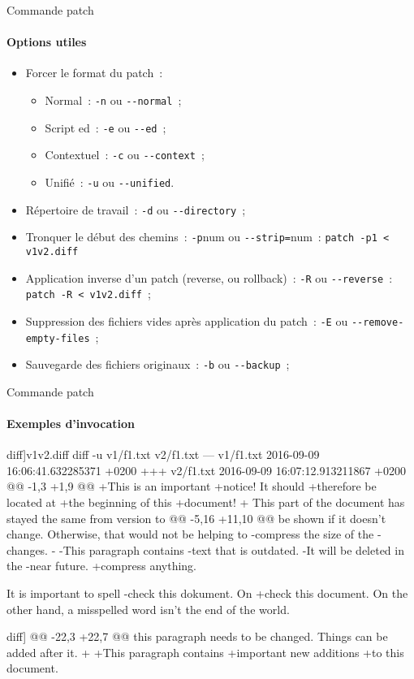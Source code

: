 \begin{frame}[fragile]{Commande patch}
\framesubtitle{Options utiles}
\begin{itemize}[<+->]
 \item Forcer le format du patch~:
 \begin{itemize}[<+->]
  \item Normal~: \verb/-n/ ou \verb/--normal/~;
  \item Script ed~: \verb/-e/ ou \verb/--ed/~;
  \item Contextuel~: \verb/-c/ ou \verb/--context/~;
  \item Unifié~: \verb/-u/ ou \verb/--unified/.
 \end{itemize}
 \item Répertoire de travail~: \verb/-d/ ou \verb/--directory/~;
 \item Tronquer le début des chemins~: \verb/-p/num ou \verb/--strip=/num~: \verb/patch -p1 < v1v2.diff/
 \item Application inverse d'un patch (reverse, ou rollback)~: \verb/-R/ ou \verb/--reverse/~: \verb/patch -R < v1v2.diff/~;
 \item Suppression des fichiers vides après application du patch~: \verb/-E/ ou \verb/--remove-empty-files/~;
 \item Sauvegarde des fichiers originaux~: \verb/-b/ ou \verb/--backup/~;
\end{itemize}
\end{frame}

\begin{frame}[fragile]{Commande patch}
\framesubtitle{Exemples d'invocation}
\begin{tcbraster}[raster columns=2, raster valign=top]
\begin{snvlisting}[[unified]diff]{v1v2.diff}
diff -u v1/f1.txt v2/f1.txt
--- v1/f1.txt   2016-09-09 16:06:41.632285371 +0200
+++ v2/f1.txt   2016-09-09 16:07:12.913211867 +0200
@@ -1,3 +1,9 @@
+This is an important
+notice! It should
+therefore be located at
+the beginning of this
+document!
+
 This part of the
 document has stayed the
 same from version to
@@ -5,16 +11,10 @@
 be shown if it doesn't
 change.  Otherwise, that
 would not be helping to
-compress the size of the
-changes.
-
-This paragraph contains
-text that is outdated.
-It will be deleted in the
-near future.
+compress anything.

 It is important to spell
-check this dokument. On
+check this document. On
 the other hand, a
 misspelled word isn't
 the end of the world.
\end{snvlisting}
\begin{snvlisting}[[unified]diff]{}
@@ -22,3 +22,7 @@
 this paragraph needs to
 be changed. Things can
 be added after it.
+
+This paragraph contains
+important new additions
+to this document.
\end{snvlisting}
\end{tcbraster}
\end{frame}

